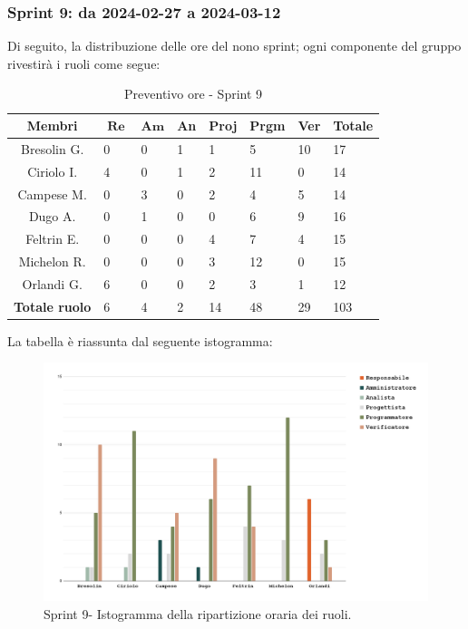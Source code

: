 \documentclass[10pt, a4paper]{article}
\begin{document}
\subsubsection{Sprint 9: da 2024-02-27 a 2024-03-12}
Di seguito, la distribuzione delle ore del nono sprint; ogni componente del gruppo rivestirà i ruoli come segue:
\begin{table}[H]
\begin{tabularx}{\textwidth}{c|X|X|X|X|X|X|X}
    \textbf{Membri} & $\operatorname{\textbf{Re}}$ & $\mathrm{\textbf{Am}}$ & \textbf{An} & \textbf{Proj} & \textbf{Prgm} & \textbf{Ver} & \textbf{Totale} \\
        \hline Bresolin G. & 0 & 0 & 1 & 1 & 5 & \cellcolor{primarycolor}10 & 17 \\
        \hline Ciriolo I.  & 4 & 0 & 1 & 2 & \cellcolor{primarycolor}11 & 0 & 14 \\
        \hline Campese M.  & 0 & 3 & 0 & 2 & \cellcolor{primarycolor}4 & 5 & 14 \\
        \hline Dugo A.     & 0 & 1 & 0 & 0 & 6 & \cellcolor{primarycolor}9 & 16 \\
        \hline Feltrin E.  & 0 & 0 & 0 & \cellcolor{primarycolor}4 & 7 & 4 & 15 \\
        \hline Michelon R. & 0 & 0 & 0 & 3 & \cellcolor{primarycolor}12 & 0 & 15 \\
        \hline Orlandi G.  & \cellcolor{primarycolor}6 & 0 & 0 & 2 & 3 & 1 & 12 \\
        \hline
        \textbf{Totale ruolo} & 6 & 4 & 2 & 14 & 48 & 29 & 103 
    \end{tabularx}
    \caption{Preventivo ore - Sprint 9}
    \end{table}

La tabella è riassunta dal seguente istogramma:
 \begin{figure}[H]
        \centering        
        \includegraphics[width=15.5cm]{istogrammi/istogramma_9_periodo.png}
        \caption{Sprint 9- Istogramma della ripartizione oraria dei ruoli. }
    \end{figure}
\end{document}

